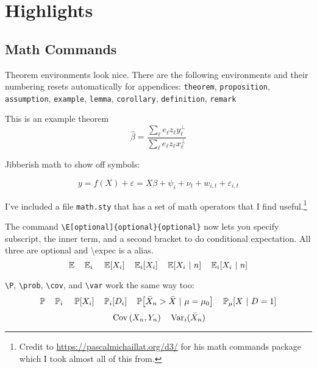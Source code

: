 \documentclass[12pt]{article}
\begin{document}
\section{Highlights}

\subsection{Math Commands}

Theorem environments look nice. There are the following environments and their numbering resets automatically for appendices: \texttt{theorem}, \texttt{proposition}, \texttt{assumption}, \texttt{example}, \texttt{lemma}, \texttt{corollary}, \texttt{definition}, \texttt{remark}

\begin{theorem}\label{thm:residue_thm}
  This is an example theorem \[
    \hat{\beta}=\frac{\sum_{\ell}e_{\ell}z_{\ell}y_{\ell}^{\perp}}{\sum_{\ell}e_{\ell}z_{\ell}x_{\ell}^{\perp}}
  \]
\end{theorem}

Jibberish math to show off symbols:

\begin{equation}\label{eq:fe_reg}
  y = f(X) + \varepsilon = X \beta + \psi_i + \nu_t + w_{i,t} + \varepsilon_{i,t}
\end{equation}

I've included a file \texttt{math.sty} that has a set of math operators that I find useful.\footnote{Credit to \url{https://pascalmichaillat.org/d3/} for his math commands package which I took almost all of this from.} 

The command \texttt{\textbackslash E[optional]\{optional\}\{optional\}} now lets you specify subscript, the inner term, and a second bracket to do conditional expectation. All three are optional and \textbackslash expec is a alias.
$$\E \quad \E[i] \quad \E{X_i} \quad \E[i]{X_i} \quad \E{X_i}{n} \quad \E[i]{X_i}{n}$$

\texttt{\textbackslash P}, \texttt{\textbackslash prob}, \texttt{\textbackslash cov}, and \texttt{\textbackslash var} work the same way too:
$$\P \quad \P[i] \quad \P{X_i} \quad \P[i]{D_i} \quad \P{\bar{X}_n > \bar{X}}{\mu = \mu_0} \quad \P[\mu]{X}{D = 1}$$
$$\cov{X_n, Y_n} \quad \var[i](\bar{X}_n)$$
\end{document}

